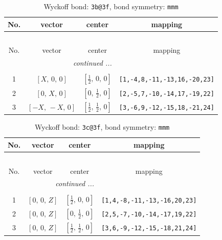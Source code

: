 \documentclass[fleqn,8pt]{jsarticle}
\begin{document}
\renewcommand{\arraystretch}{1.2}
\begin{longtable}{cccc}
\caption{Wyckoff bond: {\tt 3b@3f}, bond symmetry: {\tt mmm}}
 \\
 \hline \hline
No. & vector & center & mapping \\ \hline \endfirsthead

\multicolumn{3}{l}{\tablename\ \thetable{}} \\
 \hline \hline
No. & vector & center & mapping \\ \hline \endhead

 \hline \hline
\multicolumn{3}{r}{\footnotesize\it continued ...} \\ \endfoot

 \hline \hline
\multicolumn{3}{r}{} \\ \endlastfoot

1 & $\left[ X,\, 0,\, 0 \right]$ & $\left[ \frac{1}{2},\, 0,\, 0 \right]$ & {\tt [1,-4,8,-11,-13,16,-20,23]} \\ \hline
2 & $\left[ 0,\, X,\, 0 \right]$ & $\left[ 0,\, \frac{1}{2},\, 0 \right]$ & {\tt [2,-5,7,-10,-14,17,-19,22]} \\ \hline
3 & $\left[ - X,\, - X,\, 0 \right]$ & $\left[ \frac{1}{2},\, \frac{1}{2},\, 0 \right]$ & {\tt [3,-6,9,-12,-15,18,-21,24]} \\
\end{longtable}
\renewcommand{\arraystretch}{1.2}
\begin{longtable}{cccc}
\caption{Wyckoff bond: {\tt 3c@3f}, bond symmetry: {\tt mmm}}
 \\
 \hline \hline
No. & vector & center & mapping \\ \hline \endfirsthead

\multicolumn{3}{l}{\tablename\ \thetable{}} \\
 \hline \hline
No. & vector & center & mapping \\ \hline \endhead

 \hline \hline
\multicolumn{3}{r}{\footnotesize\it continued ...} \\ \endfoot

 \hline \hline
\multicolumn{3}{r}{} \\ \endlastfoot

1 & $\left[ 0,\, 0,\, Z \right]$ & $\left[ \frac{1}{2},\, 0,\, 0 \right]$ & {\tt [1,4,-8,-11,-13,-16,20,23]} \\ \hline
2 & $\left[ 0,\, 0,\, Z \right]$ & $\left[ 0,\, \frac{1}{2},\, 0 \right]$ & {\tt [2,5,-7,-10,-14,-17,19,22]} \\ \hline
3 & $\left[ 0,\, 0,\, Z \right]$ & $\left[ \frac{1}{2},\, \frac{1}{2},\, 0 \right]$ & {\tt [3,6,-9,-12,-15,-18,21,24]} \\
\end{longtable}
\end{document}

